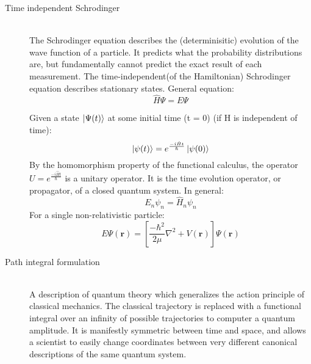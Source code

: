 \documentclass[12pt,letterpaper,oneside,final,titlepage]{article}               %
\numberwithin{equation}{section} %
\newcommand{\emiHt}{e^{\frac{-i\hat{H}t}{\hbar}}}
\renewcommand{\vec}[1]{\mathbf{#1}}
\begin{document}
\begin{description}
    \item[Time independent Schrodinger] \hfill \\
    The Schrodinger equation describes the (determinisitic) evolution of the wave function of a particle.
    It predicts what the probability distributions are, but fundamentally cannot predict the exact result of each measurement.
    The time-independent(of the Hamiltonian) Schrodinger equation describes stationary states.
    General equation:
    \begin{equation}
        \hat{H}\Psi = E\Psi
    \end{equation}

    Given a state $\ket{\Psi(t)}$ at some initial time (t = 0) (if H is independent of time):
    \begin{equation}
        \ket{\psi(t)} = \emiHt\ket{\psi(0)}
    \end{equation}
    By the homomorphism property of the functional calculus, the operator $U = \emiHt$ is a unitary operator.
    It is the time evolution operator, or propagator, of a closed quantum system. 
    In general:
    \begin{equation}
        E_{n}\psi_{n} = \hat{H}_{n}\psi_{n}
    \end{equation}
    For a single non-relativistic particle:
    \begin{equation}
        E\Psi(\vec{r}) = \left[\frac{-\hbar^{2}}{2\mu}\nabla^{2} + V(\vec{r})\right]\Psi(\vec{r})
    \end{equation}

    \item[Path integral formulation] \hfill \\
    A description of quantum theory which generalizes the action principle of classical mechanics.
    The classical trajectory is replaced with a functional integral over an infinity of possible trajectories to computer a quantum amplitude.
    It is manifestly symmetric between time and space, and allows a scientist to easily change coordinates between very different canonical descriptions of the same quantum system.    
\end{description} 
\end{document}
